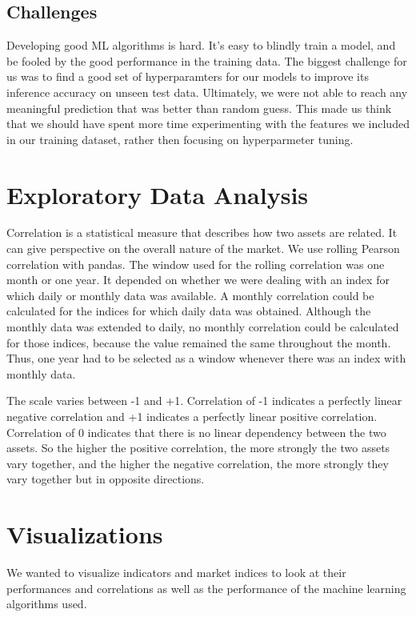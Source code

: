\documentclass[10pt]{article} %
\begin{document}
\subsection{Challenges}
Developing good ML algorithms is hard. It's easy to blindly train a model, and be fooled by the good performance in the training data. The biggest challenge for us was to find a good set of hyperparamters for our models to improve its inference accuracy on unseen test data. Ultimately, we were not able to reach any meaningful prediction that was better than random guess. This made us think that we should have spent more time experimenting with the features we included in our training dataset, rather then focusing on hyperparmeter tuning. 


\section{Exploratory Data Analysis}

Correlation is a statistical measure that describes how two assets are related. It can give perspective on the overall nature of the market. We use rolling Pearson correlation with pandas. The window used for the rolling correlation was one month or one year. It depended on whether we were dealing with an index for which daily or monthly data was available. A monthly correlation could be calculated for the indices for which daily data was obtained. Although the monthly data was extended to daily, no monthly correlation could be calculated for those indices, because the value remained the same throughout the month. Thus, one year had to be selected as a window whenever there was an index with monthly data.

The scale varies between -1 and +1. Correlation of -1 indicates a perfectly linear negative correlation and +1 indicates a perfectly linear positive correlation. Correlation of 0 indicates that there is no linear dependency between the two assets. So the higher the positive correlation, the more strongly the two assets vary together, and the higher the negative correlation, the more strongly they vary together but in opposite directions.

\section{Visualizations}

We wanted to visualize indicators and market indices to look at their performances and correlations as well as the performance of the machine learning algorithms used.
\end{document}
